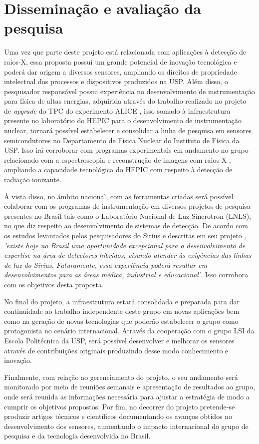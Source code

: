 \chapter{Disseminação e avaliação da pesquisa}

Uma vez que parte deste projeto está relacionada com aplicações à detecção de raios-X, essa proposta possuí um grande potencial de inovação tecnológica e poderá dar origem a diversos sensores, ampliando os direitos de propriedade intelectual dos processos e dispositivos produzidos na USP. Além disso, o pesquisador responsável possui experiência no desenvolvimento de instrumentação para física de altas energias, adquirida através do trabalho realizado no projeto de {\it upgrade} do TPC do experimento ALICE \cite{tpcNIM}, isso somado à infraestrutura presente no laboratório do HEPIC para o desenvolvimento de instrumentação nuclear, tornará possível estabelecer e consolidar a linha de pesquisa em sensores semicondutores no Departamento de Física Nuclear do Instituto de Física da USP. Isso irá corroborar com programas experimentais em andamento no grupo relacionado com a espectroscopia e reconstrução de imagens com raios-X \cite{THGEM,NIM,xray}, ampliando a capacidade tecnológica do HEPIC com respeito à detecção de radiação ionizante. 

À vista disso, no âmbito nacional, com as ferramentas criadas será possível colaborar com os programas de instrumentação em diversos projetos de pesquisa presentes no Brasil tais como o Laboratório Nacional de Luz Síncrotron (LNLS), no que diz respeito ao desenvolvimento de sistemas de detecção. De acordo com os estudos levantados pelos pesquisadores do Sirius e descritas em seu projeto \cite{sirius}, {\it 'existe hoje no Brasil uma oportunidade excepcional para o desenvolvimento de expertise na área de detectores híbridos, visando atender às exigências das linhas de luz do Sirius. Futuramente, essa experiência poderá resultar em desenvolvimentos para as áreas médica, industrial e educacional'}. Isso corrobora com os objetivos desta proposta.

No final do projeto, a infraestrutura estará consolidada e preparada para dar continuidade ao trabalho independente deste grupo em novas aplicações bem como na geração de novas tecnologias que poderão estabelecer o grupo como protagonista no cenário internacional. Através da cooperação com o grupo LSI da Escola Politécnica da USP, será possível desenvolver e melhorar os sensores através de contribuições originais produzindo desse modo conhecimento e inovação.

Finalmente, com relação ao gerenciamento do projeto, o seu andamento será monitorado por meio de reuniões semanais e apresentação de resultados ao grupo, onde será reunida as informações necessária para ajustar a estratégia de modo a cumprir os objetivos propostos. Por fim, no decorrer do projeto pretende-se produzir artigos técnicos e científicos documentando os avanços obtidos no desenvolvimento dos sensores, aumentando o impacto internacional do grupo de pesquisa e da tecnologia desenvolvida no Brasil.
